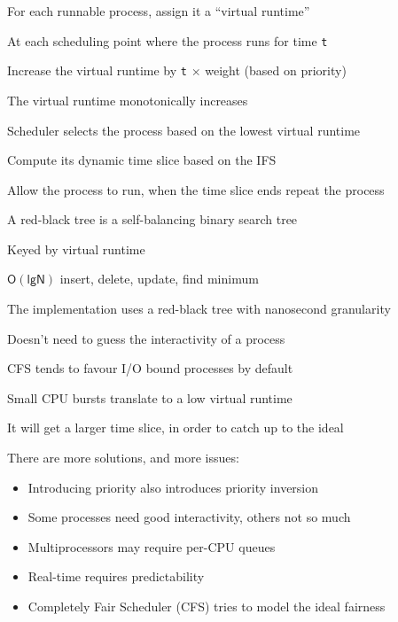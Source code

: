   \begin{slide}


    For each runnable process, assign it a ``virtual runtime''

    \leftspace{}At each scheduling point where the process runs for time \texttt{t}

    \leftspace{}\leftspace{}Increase the virtual runtime by \texttt{t}
    $\mathsf{\times}$ weight (based on priority)
    \medskip

    The virtual runtime monotonically increases

    \leftspace{}Scheduler selects the process based on the lowest virtual runtime

    \leftspace{}\leftspace{}Compute its dynamic time slice based on the IFS
    \medskip

    Allow the process to run, when the time slice ends repeat the process

  \end{slide}

  \begin{slide}


    A red-black tree is a self-balancing binary search tree

    \leftspace{}Keyed by virtual runtime

    \leftspace{}\leftspace{}$\mathsf{O(lg N)}$ insert, delete, update, find
    minimum
    \medskip

    The implementation uses a red-black tree with nanosecond granularity

    \leftspace{}Doesn't need to guess the interactivity of a process
    \medskip

    CFS tends to favour I/O bound processes by default

    \leftspace{}Small CPU bursts translate to a low virtual runtime

    \leftspace{}\leftspace{}It will get a larger time slice, in order to catch
    up to the ideal

  \end{slide}

  \begin{slide}


    There are more solutions, and more issues:

    \begin{itemize}
      \item Introducing priority also introduces priority inversion
      \item Some processes need good interactivity, others not so much
      \item Multiprocessors may require per-CPU queues
      \item Real-time requires predictability
      \item Completely Fair Scheduler (CFS) tries to model the ideal fairness
    \end{itemize}

  \end{slide}


